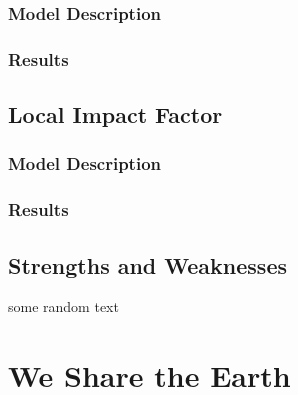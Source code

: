 \documentclass[12pt]{article}
\begin{document}
		\subsubsection{Model Description}
		
		\subsubsection{Results}
	
	\subsection{Local Impact Factor}
	
		\subsubsection{Model Description}
		
		\subsubsection{Results}

	\subsection{Strengths and Weaknesses}

	some random text
	
\section*{We Share the Earth}



\newrefcontext
\printbibliography
\end{document}

